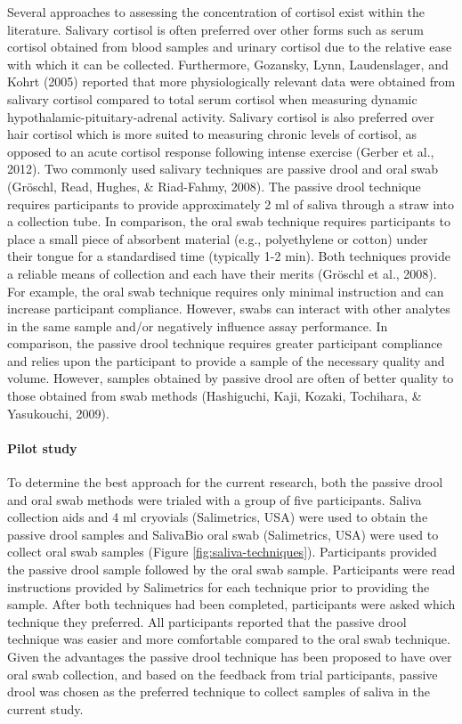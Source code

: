 \documentclass[man,floatsintext]{apa6}
\let\oldparagraph\paragraph
\renewcommand{\paragraph}[1]{\oldparagraph{#1}\mbox{}}
\begin{document}
Several approaches to assessing the concentration of cortisol exist within the literature.
Salivary cortisol is often preferred over other forms such as serum cortisol obtained from blood samples and urinary cortisol due to the relative ease with which it can be collected. Furthermore, Gozansky, Lynn, Laudenslager, and Kohrt (2005) reported that more physiologically relevant data were obtained from salivary cortisol compared to total serum cortisol when measuring dynamic hypothalamic-pituitary-adrenal activity.
Salivary cortisol is also preferred over hair cortisol which is more suited to measuring chronic levels of cortisol, as opposed to an acute cortisol response following intense exercise (Gerber et al., 2012).
Two commonly used salivary techniques are passive drool and oral swab (Gröschl, Read, Hughes, \& Riad-Fahmy, 2008).
The passive drool technique requires participants to provide approximately 2 ml of saliva through a straw into a collection tube.
In comparison, the oral swab technique requires participants to place a small piece of absorbent material (e.g., polyethylene or cotton) under their tongue for a standardised time (typically 1-2 min).
Both techniques provide a reliable means of collection and each have their merits (Gröschl et al., 2008).
For example, the oral swab technique requires only minimal instruction and can increase participant compliance.
However, swabs can interact with other analytes in the same sample and/or negatively influence assay performance.
In comparison, the passive drool technique requires greater participant compliance and relies upon the participant to provide a sample of the necessary quality and volume.
However, samples obtained by passive drool are often of better quality to those obtained from swab methods (Hashiguchi, Kaji, Kozaki, Tochihara, \& Yasukouchi, 2009).

\hypertarget{pilot-study-2}{%
\paragraph{Pilot study}\label{pilot-study-2}}

To determine the best approach for the current research, both the passive drool and oral swab methods were trialed with a group of five participants.
Saliva collection aids and 4 ml cryovials (Salimetrics, USA) were used to obtain the passive drool samples and SalivaBio oral swab (Salimetrics, USA) were used to collect oral swab samples (Figure \ref{fig:saliva-techniques}).
Participants provided the passive drool sample followed by the oral swab sample.
Participants were read instructions provided by Salimetrics for each technique prior to providing the sample.
After both techniques had been completed, participants were asked which technique they preferred.
All participants reported that the passive drool technique was easier and more comfortable compared to the oral swab technique.
Given the advantages the passive drool technique has been proposed to have over oral swab collection, and based on the feedback from trial participants, passive drool was chosen as the preferred technique to collect samples of saliva in the current study.
\end{document}
